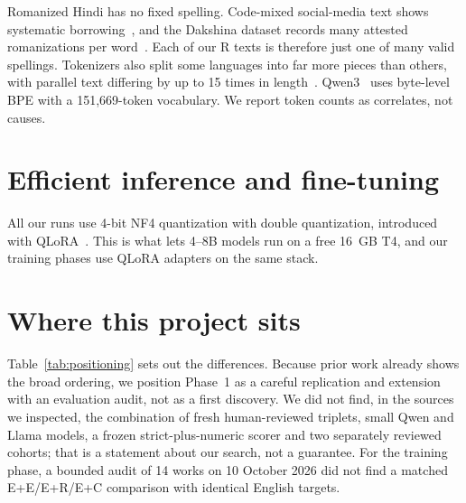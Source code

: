 \documentclass[12pt,a4paper,oneside]{report}
\renewcommand{\_}{\oldunderscore\allowbreak}
\begin{document}
Romanized Hindi has no fixed spelling. Code-mixed social-media text shows systematic borrowing~\citep{bali-etal-2014-borrowing}, and the Dakshina dataset records many attested romanizations per word~\citep{roark-etal-2020-processing}. Each of our R texts is therefore just one of many valid spellings. Tokenizers also split some languages into far more pieces than others, with parallel text differing by up to 15 times in length~\citep{petrov-etal-2023-tokenizers}. Qwen3~\citep{qwen3-2025} uses byte-level BPE with a 151,669-token vocabulary. We report token counts as correlates, not causes.

\section{Efficient inference and fine-tuning}

All our runs use 4-bit NF4 quantization with double quantization, introduced with QLoRA~\citep{dettmers-etal-2023-qlora}. This is what lets 4--8B models run on a free 16~GB T4, and our training phases use QLoRA adapters on the same stack.

\section{Where this project sits}

Table~\ref{tab:positioning} sets out the differences. Because prior work already shows the broad ordering, we position Phase~1 as a careful replication and extension with an evaluation audit, not as a first discovery. We did not find, in the sources we inspected, the combination of fresh human-reviewed triplets, small Qwen and Llama models, a frozen strict-plus-numeric scorer and two separately reviewed cohorts; that is a statement about our search, not a guarantee. For the training phase, a bounded audit of 14 works on 10 October 2026 did not find a matched E+E/E+R/E+C comparison with identical English targets.
\end{document}
